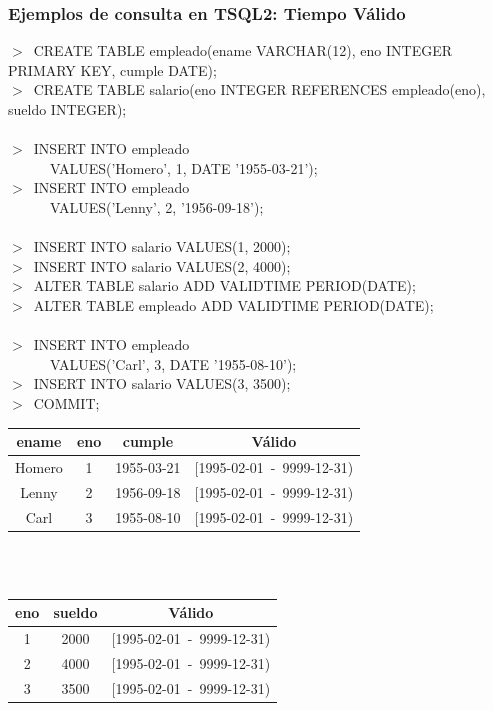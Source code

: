 \documentclass[a4paper,12pt,oneside]{report}
\begin{document}
\subsubsection*{Ejemplos de consulta en TSQL2: Tiempo V\'alido}
$>$\ CREATE TABLE empleado(ename VARCHAR(12), eno INTEGER PRIMARY KEY, cumple DATE);\\
$>$\ CREATE TABLE salario(eno INTEGER REFERENCES empleado(eno), sueldo INTEGER);\\
\ \\
$>$\ INSERT INTO empleado\\
\ \ \ \ \ \ VALUES('Homero', 1, DATE '1955-03-21');\\
$>$\ INSERT INTO empleado\\
\ \ \ \ \ \ VALUES('Lenny', 2, '1956-09-18');\\
\ \\
$>$\ INSERT INTO salario VALUES(1, 2000);\\
$>$\ INSERT INTO salario VALUES(2, 4000);\\
$>$\ ALTER TABLE salario ADD VALIDTIME PERIOD(DATE);\\
$>$\ ALTER TABLE empleado ADD VALIDTIME PERIOD(DATE);\\
\ \\
$>$\ INSERT INTO empleado\\
\ \ \ \ \ \ VALUES('Carl', 3, DATE '1955-08-10');\\
$>$\ INSERT INTO salario VALUES(3, 3500);\\
$>$\ COMMIT;
\begin{center}
\begin{tabular}{|c|c|c||c|}
\hline
ename & eno & cumple & V\'alido\\
\hline
Homero & 1 & 1955-03-21 & [1995-02-01\ -\ 9999-12-31)\\
\hline
Lenny & 2 & 1956-09-18 & [1995-02-01\ -\ 9999-12-31)\\
\hline
Carl & 3 & 1955-08-10 & [1995-02-01\ -\ 9999-12-31)\\
\hline
\end{tabular}\\
\ \\
\begin{tabular}{|c|c||c|}
\hline
eno & sueldo & V\'alido\\
\hline
1 & 2000 & [1995-02-01\ -\ 9999-12-31)\\
\hline
2 & 4000 & [1995-02-01\ -\ 9999-12-31)\\
\hline
3 & 3500 & [1995-02-01\ -\ 9999-12-31)\\
\hline
\end{tabular}
\end{center}
\end{document}

